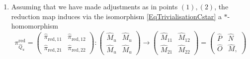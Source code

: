 \documentclass[reqno]{amsart}
\numberwithin{equation}{section}
\newcommand{\red}{\mathrm{red}}
\begin{document}
\begin{enumerate}
\[\begin{split}
\begin{pmatrix}
\hat{\varepsilon}_{11}(a) & 0\\
0 & 0 
\end{pmatrix}&=
\begin{pmatrix} \hat{\varepsilon}_{11} & \hat{\varepsilon}_{12} \\ \hat{\varepsilon}_{21} & \hat{\varepsilon}_{22}\end{pmatrix}
\biggl(
\begin{pmatrix}
0 & 1_{\hat{M}_u} \\
0 & 0
\end{pmatrix}
\begin{pmatrix}
0 & 0 \\
0 & a
\end{pmatrix}
\begin{pmatrix}
0 & 0 \\
1_{\hat{M}_u} & 0
\end{pmatrix}
\biggr)\\
&=
\begin{pmatrix}
0 & 1 \\
0 & 0
\end{pmatrix}
\begin{pmatrix}
0 & 0\\
0 & \hat{\varepsilon}_{22}(a) 
\end{pmatrix}
\begin{pmatrix}
0 & 0 \\
1 & 0
\end{pmatrix}=
\begin{pmatrix}
\hat{\varepsilon}(a) & 0 \\
0 & 0
\end{pmatrix}
\end{split}\]
and the remaining equalities can be checked in a similar way.
\item Assuming that we have made adjustments as in points $(1),(2)$, the reduction map induces via the isomorphism \eqref{EqTrivialisationCstar} a $*$-homomorphism
\begin{equation}\label{eq8}
\pi_{\hat{Q}_u}^{\red}= \begin{pmatrix} \hat{\pi}_{\red,11} & \hat{\pi}_{\red,12} \\ \hat{\pi}_{\red,21} & \hat{\pi}_{\red,22}\end{pmatrix}\colon \begin{pmatrix} \hat{M}_u& \hat{M}_u\\ \hat{M}_u&\hat{M}_u\end{pmatrix} \rightarrow \begin{pmatrix} \hat{M}_{11}& \hat{M}_{12}\\ \hat{M}_{21}&\hat{M}_{22}\end{pmatrix} = \begin{pmatrix} \hat{P} & \hat{N}\\ \hat{O}& \hat{M},\end{pmatrix} 

\end{equation}
\end{enumerate}
\end{document}
